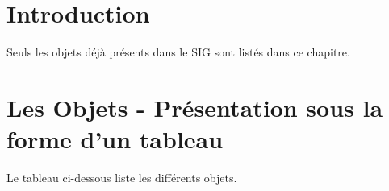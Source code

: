 \documentclass[12pt,titlepage]{book}
\begin{document}
\section{Introduction}
Seuls les objets déjà présents dans le SIG sont listés dans ce chapitre.


\section{Les Objets - Présentation sous la forme d'un tableau}
Le tableau ci-dessous liste les différents objets.
\vspace{\baselineskip}
\end{document}
